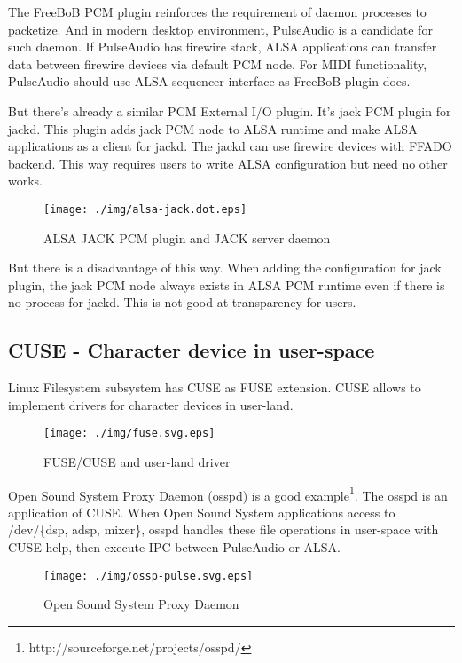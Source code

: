 \documentclass[onecolumn]{article}
\begin{document}
The FreeBoB PCM plugin reinforces the requirement of daemon processes to packetize. And in modern desktop environment, PulseAudio is a candidate for such daemon. If PulseAudio has firewire stack, ALSA applications can transfer data between firewire devices via default PCM node. For MIDI functionality, PulseAudio should use ALSA sequencer interface as FreeBoB plugin does.

But there's already a similar PCM External I/O plugin. It's jack PCM plugin for jackd. This plugin adds jack PCM node to ALSA runtime and make ALSA applications as a client for jackd. The jackd can use firewire devices with FFADO backend. This way requires users to write ALSA configuration but need no other works.

\begin{figure}[H]
	\centering
	\texttt{[image: ./img/alsa-jack.dot.eps]}
	\caption{{ALSA JACK PCM plugin and JACK server daemon}}
	\label{alsa_jack}
\end{figure}

But there is a disadvantage of this way. When adding the configuration for jack plugin, the jack PCM node always exists in ALSA PCM runtime even if there is no process for jackd. This is not good at transparency for users.


\subsection{CUSE - Character device in user-space}
Linux Filesystem subsystem has CUSE as FUSE extension. CUSE allows to implement drivers for character devices in user-land.

\begin{figure}[H]
	\centering
	\texttt{[image: ./img/fuse.svg.eps]}
	\caption{{FUSE/CUSE and user-land driver}}
	\label{fuse}
\end{figure}

Open Sound System Proxy Daemon (osspd) is a good example\footnote{http://sourceforge.net/projects/osspd/}. The osspd is an application of CUSE. When Open Sound System applications access to /dev/\{dsp, adsp, mixer\}, osspd handles these file operations in user-space with CUSE help, then execute IPC between PulseAudio or ALSA.

\begin{figure}[H]
	\centering
	\texttt{[image: ./img/ossp-pulse.svg.eps]}
	\caption{{Open Sound System Proxy Daemon}}
	\label{osspd_pulse}
\end{figure}
\end{document}
